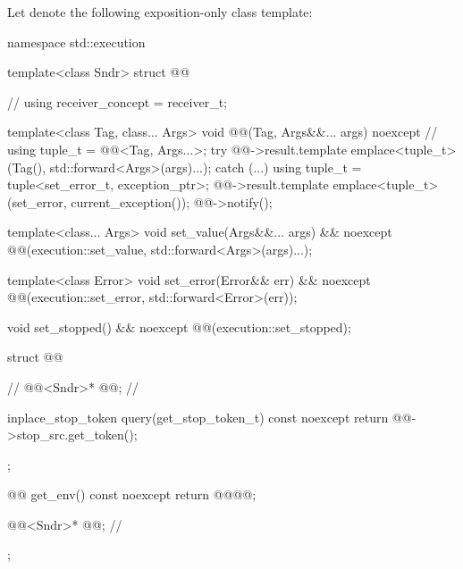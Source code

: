 \pnum
Let  denote
the following exposition-only class template:
\begin{codeblock}
namespace std::execution {
  template<class Sndr>
  struct @@ {                                       // \expos
    using receiver_concept = receiver_t;

    template<class Tag, class... Args>
    void @@(Tag, Args&&... args) noexcept {               // \expos
      using tuple_t = @@<Tag, Args...>;
      try {
        @@->result.template emplace<tuple_t>(Tag(), std::forward<Args>(args)...);
      } catch (...) {
        using tuple_t = tuple<set_error_t, exception_ptr>;
        @@->result.template emplace<tuple_t>(set_error, current_exception());
      }
      @@->notify();
    }

    template<class... Args>
    void set_value(Args&&... args) && noexcept {
      @@(execution::set_value, std::forward<Args>(args)...);
    }

    template<class Error>
    void set_error(Error&& err) && noexcept {
      @@(execution::set_error, std::forward<Error>(err));
    }

    void set_stopped() && noexcept {
      @@(execution::set_stopped);
    }

    struct @@ {                                                // \expos
      @@<Sndr>* @@;                             // \expos

      inplace_stop_token query(get_stop_token_t) const noexcept {
        return @@->stop_src.get_token();
      }
    };

    @@ get_env() const noexcept {
      return @@{@@};
    }

    @@<Sndr>* @@;                               // \expos
  };
}
\end{codeblock}

